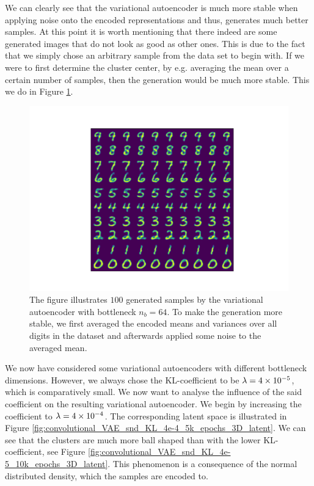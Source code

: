 We can clearly see that the variational autoencoder is much more stable when applying noise onto the encoded representations and thus, generates much better samples. At this point it is worth mentioning that there indeed are some generated images that do not look as good as other ones. This is due to the fact that we simply chose an arbitrary sample from the data set to begin with. If we were to first determine the cluster center, by e.g. averaging the mean over a certain number of samples, then the generation would be much more stable. This we do in Figure \ref{fig:convolutional_VAE_better_generations}.


\begin{figure}
\begin{center}
   \begin{minipage}[b]{0.60\linewidth}
      \includegraphics[trim = 15mm 10mm 15mm 10mm, clip, width=\linewidth]{convolutional_VAE_snd_KL_4e-5_10k_epochs_64D_generated_optimal}
	\end{minipage}
\end{center}
\caption{The figure illustrates $100$ generated samples by the variational autoencoder with bottleneck $n_b=64$. To make the generation more stable, we first averaged the encoded means and variances over all digits in the dataset and afterwards applied some noise to the averaged mean.}\label{fig:convolutional_VAE_better_generations}
\end{figure}


We now have considered some variational autoencoders with different bottleneck dimensions. However, we always chose the KL-coefficient to be $\lambda = \num{4e-5}$, which is comparatively small. We now want to analyse the influence of the said coefficient on the resulting variational autoencoder. We begin by increasing the coefficient to $\lambda = \num{4e-4}$. The corresponding latent space is illustrated in Figure \ref{fig:convolutional_VAE_snd_KL_4e-4_5k_epochs_3D_latent}. We can see that the clusters are much more ball shaped than with the lower KL-coefficient, see Figure \ref{fig:convolutional_VAE_snd_KL_4e-5_10k_epochs_3D_latent}. This phenomenon is a consequence of the normal distributed density, which the samples are encoded to.

